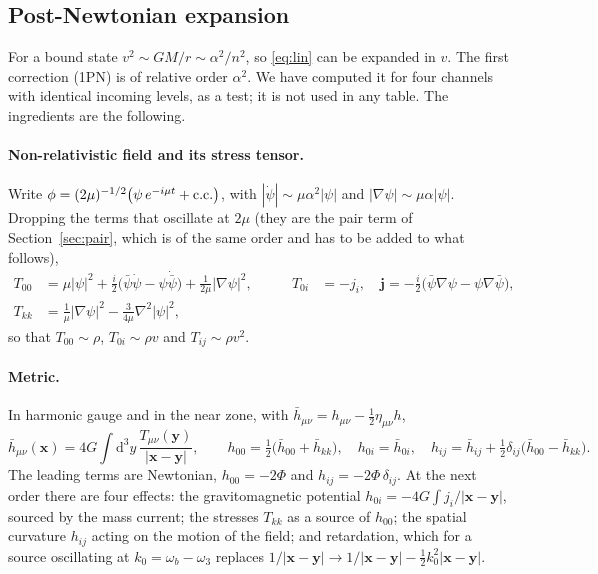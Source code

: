 \documentclass[11pt]{article}
\newcommand{\bx}{\mathbf{x}}\newcommand{\by}{\mathbf{y}}
\newcommand{\dd}{\mathrm{d}}
\begin{document}
\subsection{Post-Newtonian expansion}
For a bound state $v^2\sim GM/r\sim\alpha^2/n^2$, so \eqref{eq:lin} can be expanded in $v$. The first correction (1PN) is of relative
order $\alpha^2$. We have computed it for four channels with identical incoming levels, as a test; it is not used in any table.
The ingredients are the following.

\paragraph{Non-relativistic field and its stress tensor.} Write $\phi=(2\mu)^{-1/2}\big(\psi\,e^{-i\mu t}+{\rm c.c.}\big)$, with
$|\dot\psi|\sim\mu\alpha^2|\psi|$ and $|\nabla\psi|\sim\mu\alpha|\psi|$. Dropping the terms that oscillate at $2\mu$
(they are the pair term of Section~\ref{sec:pair}, which is of the same order and has to be added to what follows),
\begin{equation}
\begin{aligned}
T_{00}&=\mu|\psi|^2+\tfrac{i}{2}\big(\bar\psi\dot\psi-\psi\dot{\bar\psi}\big)+\tfrac{1}{2\mu}|\nabla\psi|^2, &\qquad
T_{0i}&=-j_i,\quad \mathbf j=-\tfrac{i}{2}\big(\bar\psi\nabla\psi-\psi\nabla\bar\psi\big),\\
T_{kk}&=\tfrac1\mu|\nabla\psi|^2-\tfrac{3}{4\mu}\nabla^2|\psi|^2 ,
\end{aligned}
\end{equation}
so that $T_{00}\sim\rho$, $T_{0i}\sim\rho v$ and $T_{ij}\sim\rho v^2$.

\paragraph{Metric.} In harmonic gauge and in the near zone, with $\bar h_{\mu\nu}=h_{\mu\nu}-\tfrac12\eta_{\mu\nu}h$,
\begin{equation}
\bar h_{\mu\nu}(\bx)=4G\!\int\!\dd^3y\,\frac{T_{\mu\nu}(\by)}{|\bx-\by|},\qquad
h_{00}=\tfrac12\big(\bar h_{00}+\bar h_{kk}\big),\quad h_{0i}=\bar h_{0i},\quad
h_{ij}=\bar h_{ij}+\tfrac12\delta_{ij}\big(\bar h_{00}-\bar h_{kk}\big).
\end{equation}
The leading terms are Newtonian, $h_{00}=-2\Phi$ and $h_{ij}=-2\Phi\,\delta_{ij}$. At the next order there are four effects:
the gravitomagnetic potential $h_{0i}=-4G\!\int\!j_i/|\bx-\by|$, sourced by the mass current; the stresses $T_{kk}$ as a source of $h_{00}$;
the spatial curvature $h_{ij}$ acting on the motion of the field; and retardation, which for a source oscillating at
$k_0=\omega_b-\omega_3$ replaces $1/|\bx-\by|\to1/|\bx-\by|-\tfrac12k_0^2|\bx-\by|$.
\end{document}
